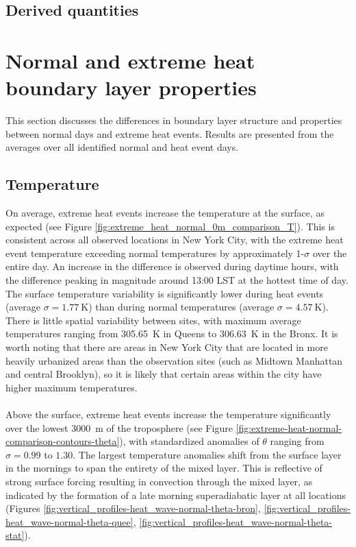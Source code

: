 \documentclass[num-refs]{wiley-article}
\begin{document}
\subsection{Derived quantities}

\section{Normal and extreme heat boundary layer properties}
This section discusses the differences in boundary layer structure and properties between normal days and extreme heat events. Results are presented from the averages over all identified normal and heat event days.

\subsection{Temperature}
On average, extreme heat events increase the temperature at the surface, as expected (see Figure \ref{fig:extreme_heat_normal_0m_comparison_T}). This is consistent across all observed locations in New York City, with the extreme heat event temperature exceeding normal temperatures by approximately 1-$\sigma$ over the entire day. An increase in the difference is observed during daytime hours, with the difference peaking in magnitude around 13:00 LST at the hottest time of day. The surface temperature variability is significantly lower during heat events (average $ \sigma = \SI{1.77}{\kelvin} $) than during normal temperatures (average $ \sigma = \SI{4.57}{\kelvin} $). There is little spatial variability between sites, with maximum average temperatures ranging from \SI{305.65}{\kelvin} in Queens to \SI{306.63}{\kelvin} in the Bronx. It is worth noting that there are areas in New York City that are located in more heavily urbanized areas than the observation sites (such as Midtown Manhattan and central Brooklyn), so it is likely that certain areas within the city have higher maximum temperatures. 
\\ \\
Above the surface, extreme heat events increase the temperature significantly over the lowest \SI{3000}{\meter} of the troposphere (see Figure \ref{fig:extreme-heat-normal-comparison-contours-theta}), with standardized anomalies of $\theta$ ranging from $\sigma = 0.99$ to $1.30$. The largest temperature anomalies shift from the surface layer in the mornings to span the entirety of the mixed layer. This is reflective of strong surface forcing resulting in convection through the mixed layer, as indicated by the formation of a late morning superadiabatic layer at all locations (Figures \ref{fig:vertical_profiles-heat_wave-normal-theta-bron}, \ref{fig:vertical_profiles-heat_wave-normal-theta-quee}, \ref{fig:vertical_profiles-heat_wave-normal-theta-stat}). 
\end{document}
